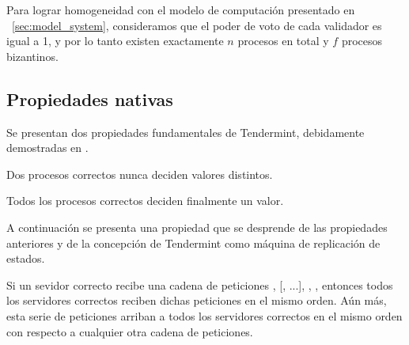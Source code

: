 Para lograr homogeneidad con el modelo de computación presentado en ~\ref{sec:model_system},
consideramos que el poder de voto de cada validador es igual a 1, y por lo tanto existen exactamente
$n$ procesos en total y $f$ procesos bizantinos.
 
\subsection{Propiedades nativas}
Se presentan dos propiedades fundamentales de Tendermint, debidamente demostradas en \cite{Buchman.2018.Tendermint}.

\setcounter{prop:tendermint}{\value{property}}

\begin{property}\label{tendermint:agreement}
  Dos procesos correctos nunca deciden valores distintos.
\end{property}

\begin{property}\label{tendermint:termination}
    Todos los procesos correctos deciden finalmente un valor.
\end{property}

A continuación se presenta una propiedad que se desprende de las propiedades anteriores
y de la concepción de Tendermint
como máquina de replicación de estados.

\begin{property}\label{tendermint:global-delivery}
  Si un sevidor correcto recibe una cadena de peticiones
  \BeginBlock, [\DeliverTx, ...], \EndBlock, \Commit,
  entonces todos los servidores correctos reciben dichas peticiones en el mismo orden.
  Aún más, esta serie de peticiones arriban a todos los servidores correctos en
  el mismo orden con respecto a cualquier otra cadena de peticiones.
\end{property}



